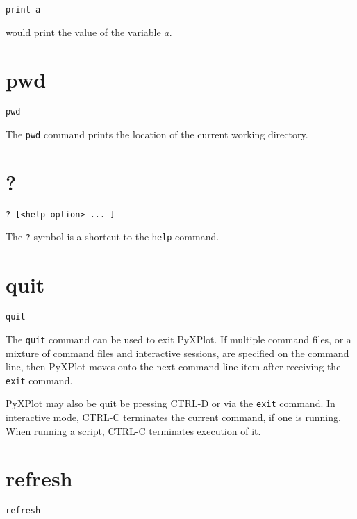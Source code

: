 \documentclass[a4paper,onecolumn,11pt]{book}
\begin{document}
\begin{verbatim}
print a
\end{verbatim}

\noindent would print the value of the variable $a$.


\section{pwd}

\begin{verbatim}
pwd
\end{verbatim}

The {\tt pwd} command prints the location of the current working directory.


\section{?}

\begin{verbatim}
? [<help option> ... ]
\end{verbatim}

The {\tt ?} symbol is a shortcut to the {\tt help} command.


\section{quit}

\begin{verbatim}
quit
\end{verbatim}

The {\tt quit} command can be used to exit PyXPlot. If multiple command files,
or a mixture of command files and interactive sessions, are specified on the
command line, then PyXPlot moves onto the next command-line item after receiving
the {\tt exit} command.

PyXPlot may also be quit be pressing CTRL-D or via the {\tt exit} command. In
interactive mode, CTRL-C terminates the current command, if one is running.
When running a script, CTRL-C terminates execution of it.


\section{refresh}

\begin{verbatim}
refresh
\end{verbatim}
\end{document}
